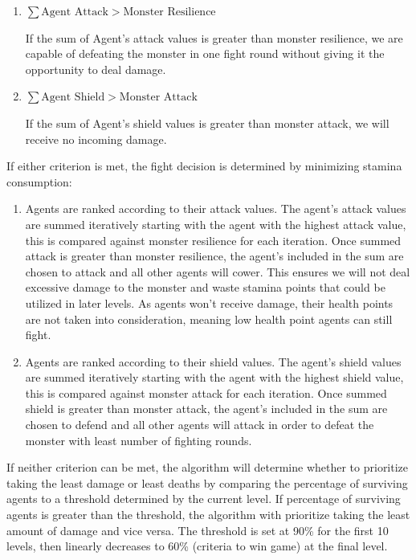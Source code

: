 \begin{enumerate}
    \item
          $\sum{\text{Agent Attack}} > \text{Monster Resilience}$

          If the sum of Agent's attack values is greater than monster resilience, we are capable of defeating the monster in one fight round without giving it the opportunity to deal damage.

    \item
          $\sum{\text{Agent Shield}} > \text{Monster Attack}$

          If the sum of Agent's shield values is greater than monster attack, we will receive no incoming damage.
\end{enumerate}

If either criterion is met, the fight decision is determined by minimizing stamina consumption:

\begin{enumerate}
    \item  Agents are ranked according to their attack values. The agent's attack values are summed iteratively starting with the agent with the highest attack value, this is compared against monster resilience for each iteration. Once summed attack is greater than monster resilience, the agent's included in the sum are chosen to attack and all other agents will cower. This ensures we will not deal excessive damage to the monster and waste stamina points that could be utilized in later levels. As agents won't receive damage, their health points are not taken into consideration, meaning low health point agents can still fight.
    \item  Agents are ranked according to their shield values. The agent's shield values are summed iteratively starting with the agent with the highest shield value, this is compared against monster attack for each iteration. Once summed shield is greater than monster attack, the agent's included in the sum are chosen to defend and all other agents will attack in order to defeat the monster with least number of fighting rounds.
\end{enumerate}

If neither criterion can be met, the algorithm will determine whether to prioritize taking the least damage or least deaths by comparing the percentage of surviving agents to a threshold determined by the current level. If percentage of surviving agents is greater than the threshold, the algorithm with prioritize taking the least amount of damage and vice versa. The threshold is set at 90\% for the first 10 levels, then linearly decreases to 60\% (criteria to win game) at the final level.

